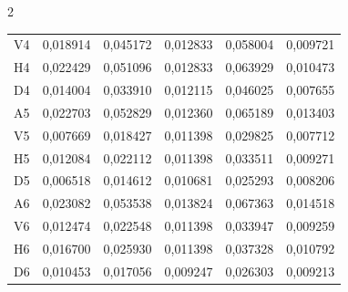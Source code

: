 \begin{multicols}{2}
\begin{table}[b]
\begin{center}
\begin{tabular}{|c|c|c|c|c|c|}

V4 & 0,018914 & 0,045172 & 0,012833 & 0,058004 & 0,009721\\


H4 & 0,022429 & 0,051096 & 0,012833 & 0,063929 & 0,010473\\


D4 & 0,014004 & 0,033910 & 0,012115 & 0,046025 & 0,007655\\


A5 & 0,022703 & 0,052829 & 0,012360 & 0,065189 & 0,013403\\


V5 & 0,007669 & 0,018427 & 0,011398 & 0,029825 & 0,007712\\


H5 & 0,012084 & 0,022112 & 0,011398 & 0,033511 & 0,009271\\


D5 & 0,006518 & 0,014612 & 0,010681 & 0,025293 & 0,008206\\


A6 & 0,023082 & 0,053538 & 0,013824 & 0,067363 & 0,014518\\


V6 & 0,012474 & 0,022548 & 0,011398 & 0,033947 & 0,009259\\


H6 & 0,016700 & 0,025930 & 0,011398 & 0,037328 & 0,010792\\


D6 & 0,010453 & 0,017056 & 0,009247 & 0,026303 & 0,009213\\

\hline

\end{tabular}

\end{center}




\begin{center}


\end{center}
\end{table}
\end{multicols}

